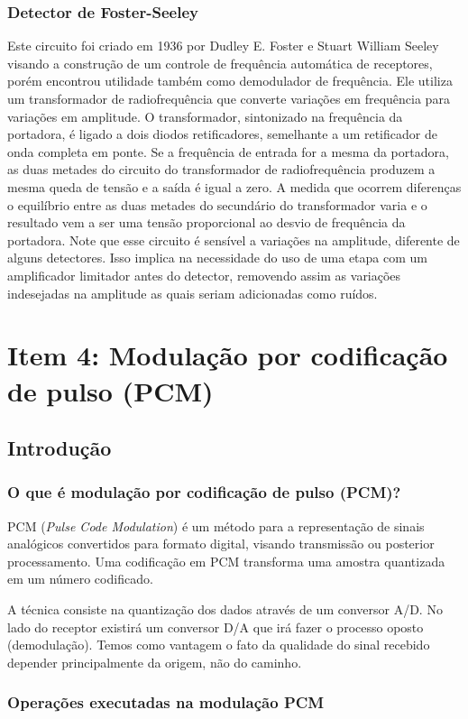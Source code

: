 \documentclass[]{report}
\begin{document}
\subsection{Detector de Foster-Seeley}
Este circuito foi criado em 1936 por Dudley E. Foster e Stuart William Seeley visando a construção de um controle de frequência automática de receptores, porém encontrou utilidade também como demodulador de frequência. 
Ele utiliza um transformador de radiofrequência que converte variações em frequência para variações em amplitude. O transformador, sintonizado na frequência da portadora, é ligado a dois diodos retificadores, semelhante a um retificador de onda completa em ponte.
Se a frequência de entrada for a mesma da portadora, as duas metades do circuito do transformador de radiofrequência produzem a mesma queda de tensão e a saída é igual a zero. A medida que ocorrem diferenças o equilíbrio entre as duas metades do secundário do transformador varia e o resultado vem a ser uma tensão proporcional ao desvio de frequência da portadora.
Note que esse circuito é sensível a variações na amplitude, diferente de alguns detectores. Isso implica na necessidade do uso de uma etapa com um amplificador limitador antes do detector, removendo assim as variações indesejadas na amplitude as quais seriam adicionadas como ruídos.

\chapter{Item 4: Modulação por codificação de pulso (PCM)}
\section{Introdução}
\subsection{O que é modulação por codificação de pulso (PCM)?}
PCM (\textit{Pulse Code Modulation}) é um método para a representação de sinais analógicos convertidos para formato digital, visando transmissão ou posterior processamento. Uma codificação em PCM transforma uma amostra quantizada em um número codificado. \cite{renato}

A técnica consiste na quantização dos dados através de um conversor A/D. No lado do receptor existirá um conversor D/A que irá fazer o processo oposto (demodulação). Temos como vantagem o fato da qualidade do sinal recebido depender principalmente da origem, não do caminho.
\subsection{Operações executadas na modulação PCM}
\end{document}
